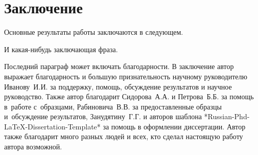 \chapter*{Заключение}						%


Основные результаты работы заключаются в следующем.

И какая-нибудь заключающая фраза.

Последний параграф может включать благодарности.  В заключение автор
выражает благодарность и большую признательность научному руководителю
Иванову~И.\:И. за поддержку, помощь, обсуждение результатов и научное
руководство. Также автор благодарит Сидорова~А.\:А. и Петрова~Б.\:Б. за
помощь в~работе с~образцами, Рабиновича~В.\:В. за предоставленные
образцы и~обсуждение результатов, Занудятину~Г.\:Г. и авторов шаблона
*Russian-Phd-LaTeX-Dissertation-Template* за помощь в оформлении
диссертации. Автор также благодарит много разных людей и
всех, кто сделал настоящую работу автора возможной.
